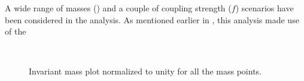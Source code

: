 A wide range of \qstar masses (\mqstar) and a couple of coupling strength ($f$) scenarios have been considered in the analysis. As mentioned earlier in \sectn{\ref{Se:qstarTheory}}, this analysis made use of the
\begin{figure}[h!]
\centering
  \\
 \caption{Invariant mass plot normalized to unity for all the \qstar mass points.}
 \label{Fig:QstarShapes}
\end{figure}
